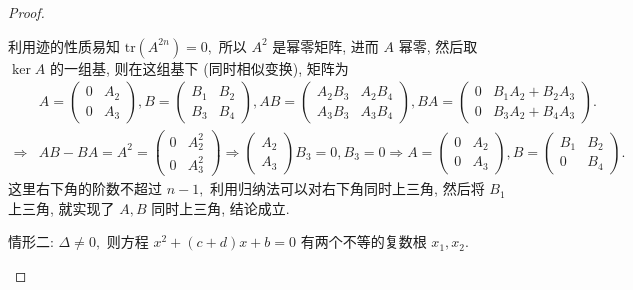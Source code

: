 \documentclass[../../main.tex]{subfiles}%
\begin{document}
\begin{proof}
\begin{enumerate}[(1)]
利用迹的性质易知 \(\mathrm{tr}(A^{2n})=0,\) 所以 \(A^2\) 是幂零矩阵, 进而 \(A\) 幂零, 然后取 \(\ker A\) 的一组基, 则在这组基下 (同时相似变换), 矩阵为
\begin{align*}
&A = \begin{pmatrix} 0 & A_2 \\ 0 & A_3 \end{pmatrix}, B = \begin{pmatrix} B_1 & B_2 \\ B_3 & B_4 \end{pmatrix},
AB = \begin{pmatrix} A_2B_3 & A_2B_4 \\ A_3B_3 & A_3B_4 \end{pmatrix}, BA = \begin{pmatrix} 0 & B_1A_2+B_2A_3 \\ 0 & B_3A_2+B_4A_3 \end{pmatrix}. \\
\Longrightarrow &AB-BA = A^2 = \begin{pmatrix} 0 & A_2^2 \\ 0 & A_3^2 \end{pmatrix}
\Longrightarrow \begin{pmatrix} A_2 \\ A_3 \end{pmatrix} B_3 = 0, B_3=0 \Longrightarrow A = \begin{pmatrix} 0 & A_2 \\ 0 & A_3 \end{pmatrix}, B = \begin{pmatrix} B_1 & B_2 \\ 0 & B_4 \end{pmatrix}.
\end{align*}
这里右下角的阶数不超过 \(n-1,\) 利用归纳法可以对右下角同时上三角, 然后将 \(B_1\) 上三角, 就实现了 \(A, B\) 同时上三角, 结论成立.

情形二: \(\Delta \ne 0,\) 则方程 \(x^2+(c+d)x+b=0\) 有两个不等的复数根 \(x_1, x_2.\)


\end{enumerate}
\end{proof}
\end{document}
